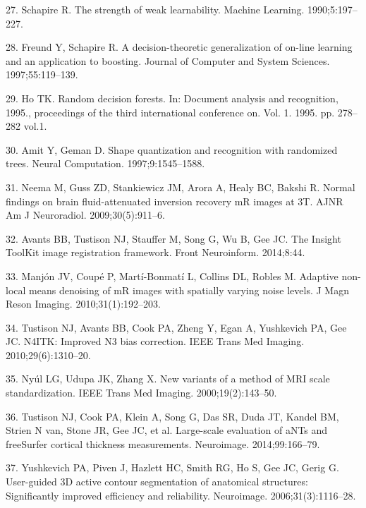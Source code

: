 \documentclass[11pt,]{article}
\begin{document}
\hypertarget{ref-schapire1990}{}
27. Schapire R. The strength of weak learnability. Machine Learning.
1990;5:197--227.

\hypertarget{ref-freund1997}{}
28. Freund Y, Schapire R. A decision-theoretic generalization of on-line
learning and an application to boosting. Journal of Computer and System
Sciences. 1997;55:119--139.

\hypertarget{ref-ho1995}{}
29. Ho TK. Random decision forests. In: Document analysis and
recognition, 1995., proceedings of the third international conference
on. Vol. 1. 1995. pp. 278--282 vol.1.

\hypertarget{ref-amit1997}{}
30. Amit Y, Geman D. Shape quantization and recognition with randomized
trees. Neural Computation. 1997;9:1545--1588.

\hypertarget{ref-Neema:2009aa}{}
31. Neema M, Guss ZD, Stankiewicz JM, Arora A, Healy BC, Bakshi R.
Normal findings on brain fluid-attenuated inversion recovery mR images
at 3T. AJNR Am J Neuroradiol. 2009;30(5):911--6.

\hypertarget{ref-Avants:2014aa}{}
32. Avants BB, Tustison NJ, Stauffer M, Song G, Wu B, Gee JC. The
Insight ToolKit image registration framework. Front Neuroinform.
2014;8:44.

\hypertarget{ref-Manjon:2010aa}{}
33. Manjón JV, Coupé P, Martí-Bonmatí L, Collins DL, Robles M. Adaptive
non-local means denoising of mR images with spatially varying noise
levels. J Magn Reson Imaging. 2010;31(1):192--203.

\hypertarget{ref-Tustison:2010ac}{}
34. Tustison NJ, Avants BB, Cook PA, Zheng Y, Egan A, Yushkevich PA, Gee
JC. N4ITK: Improved N3 bias correction. IEEE Trans Med Imaging.
2010;29(6):1310--20.

\hypertarget{ref-nyul2000}{}
35. Nyúl LG, Udupa JK, Zhang X. New variants of a method of MRI scale
standardization. IEEE Trans Med Imaging. 2000;19(2):143--50.

\hypertarget{ref-Tustison:2014ab}{}
36. Tustison NJ, Cook PA, Klein A, Song G, Das SR, Duda JT, Kandel BM,
Strien N van, Stone JR, Gee JC, et al. Large-scale evaluation of aNTs
and freeSurfer cortical thickness measurements. Neuroimage.
2014;99:166--79.

\hypertarget{ref-Yushkevich:2006aa}{}
37. Yushkevich PA, Piven J, Hazlett HC, Smith RG, Ho S, Gee JC, Gerig G.
User-guided 3D active contour segmentation of anatomical structures:
Significantly improved efficiency and reliability. Neuroimage.
2006;31(3):1116--28.
\end{document}
